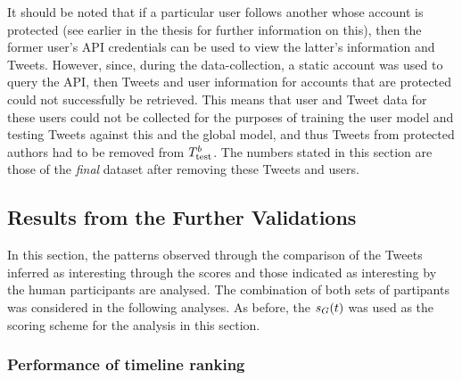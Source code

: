 It should be noted that if a particular user follows another whose account is protected (see earlier in the thesis for further information on this), then the former user's API credentials can be used to view the latter's information and Tweets. However, since, during the data-collection, a static account was used to query the API, then Tweets and user information for accounts that are protected could not successfully be retrieved. This means that user and Tweet data for these users could not be collected for the purposes of training the user model and testing Tweets against this and the global model, and thus Tweets from protected authors had to be removed from $T^b_{\textrm{test}}{}$. The numbers stated in this section are those of the \textit{final} dataset after removing these Tweets and users.


\subsection{Results from the Further Validations}
In this section, the patterns observed through the comparison of the Tweets inferred as interesting through the scores and those indicated as interesting by the human participants are analysed. The combination of both sets of partipants was considered in the following analyses. As before, the $s_G(t)$ was used as the scoring scheme for the analysis in this section.

\subsubsection{Performance of timeline ranking}

